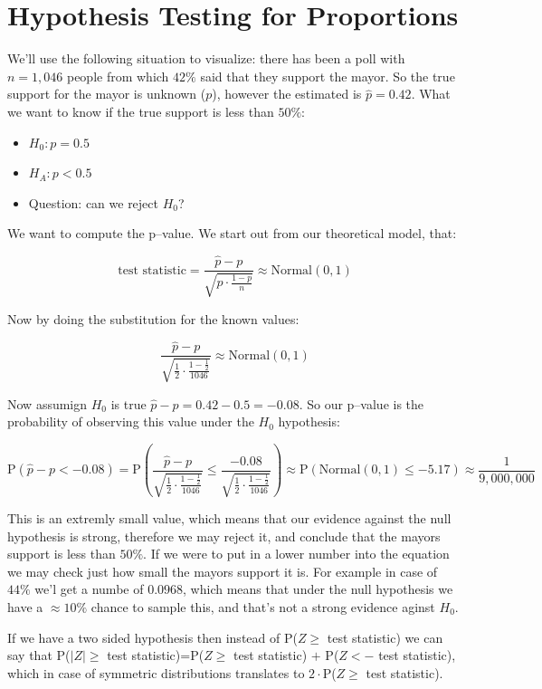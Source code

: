 \section{Hypothesis Testing for Proportions}

We'll use the following situation to visualize: there has been a poll with
$n=1,046$ people from which $42\%$ said that they support the mayor. So the true
support for the mayor is unknown ($p$), however the estimated is $\hat{p}=0.42$.
What we want to know if the true support is less than $50\%$:

\begin{itemize}
  \item $H_0: p = 0.5$
  \item $H_A: p < 0.5$
  \item Question: can we reject $H_0$?
\end{itemize}

We want to compute the p--value. We start out from our theoretical model, that:

\[ \mbox{test statistic} = \frac{\hat{p}-p}{\sqrt{p\cdot\frac{1-p}{n}}} \approx
\mbox{Normal}(0,1)
\]

Now by doing the substitution for the known values:

\[ \frac{\hat{p}-p}{\sqrt{\frac{1}{2}\cdot\frac{1-\frac{1}{2}}{1046}}} \approx
\mbox{Normal}(0,1)
\]

Now assumign $H_0$ is true $\hat{p}-p=0.42-0.5=-0.08$. So our p--value is the
probability of observing this value under the $H_0$ hypothesis:

\[ \mbox{P}(\hat{p}-p < -0.08) = \mbox{P} \left(
\frac{\hat{p}-p}{\sqrt{\frac{1}{2}\cdot\frac{1-\frac{1}{2}}{1046}}} \leq
\frac{-0.08}{\sqrt{\frac{1}{2}\cdot\frac{1-\frac{1}{2}}{1046}}} \right)
\approx \mbox{P}\left( \mbox{Normal} \left( 0,1\right) \leq -5.17 \right)
\approx \frac{1}{9,000,000}
\]

This is an extremly small value, which means that our evidence against the null
hypothesis is strong, therefore we may reject it, and conclude that the mayors
support is less than $50\%$. If we were to put in a lower number into the
equation we may check just how small the mayors support it is. For example in
case of $44\%$ we'l get a numbe of $0.0968$, which means that under the null
hypothesis we have a $\approx 10\%$ chance to sample this, and that's not a
strong evidence aginst $H_0$.

If we have a two sided hypothesis then instead of P($Z \geq$  test statistic) we
can say that P($|Z| \geq$  test statistic)=P($Z \geq$  test statistic) $+$
P($Z <-$  test statistic), which in case of symmetric distributions
translates to $2\cdot$P($Z \geq$  test statistic).

